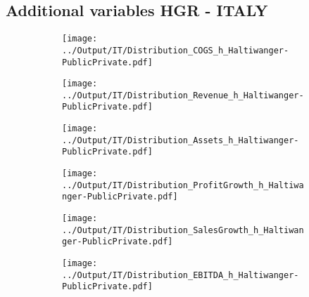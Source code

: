 \documentclass[12pt,notitlepage]{article}
\begin{document}
\subsection{Additional variables HGR - ITALY}
\begin{figure}[!htpb]
\centering
\begin{subfigure}{.49\textwidth}
    \centering
 \texttt{[image: ../Output/IT/Distribution\_COGS\_h\_Haltiwanger-PublicPrivate.pdf]}
\end{subfigure}%
\begin{subfigure}{.49\textwidth}
    \centering
 \texttt{[image: ../Output/IT/Distribution\_Revenue\_h\_Haltiwanger-PublicPrivate.pdf]}
\end{subfigure}
\begin{subfigure}{.49\textwidth}
    \centering
 \texttt{[image: ../Output/IT/Distribution\_Assets\_h\_Haltiwanger-PublicPrivate.pdf]}
\end{subfigure}%
\begin{subfigure}{.49\textwidth}
    \centering
 \texttt{[image: ../Output/IT/Distribution\_ProfitGrowth\_h\_Haltiwanger-PublicPrivate.pdf]}
\end{subfigure}
\begin{subfigure}{.49\textwidth}
    \centering
 \texttt{[image: ../Output/IT/Distribution\_SalesGrowth\_h\_Haltiwanger-PublicPrivate.pdf]}
\end{subfigure}
\begin{subfigure}{.49\textwidth}
    \centering
 \texttt{[image: ../Output/IT/Distribution\_EBITDA\_h\_Haltiwanger-PublicPrivate.pdf]}
\end{subfigure}
\end{figure}
\clearpage
\end{document}
